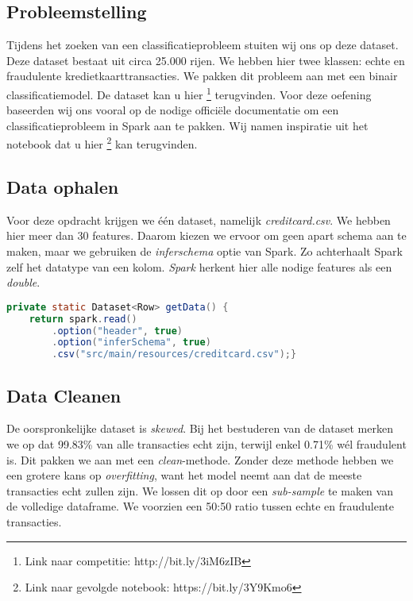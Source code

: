 \documentclass[a4paper,10pt,twoside]{report}
\begin{document}
\subsection*{Probleemstelling}

Tijdens het zoeken van een classificatieprobleem stuiten wij ons op deze dataset. Deze dataset bestaat uit circa 25.000 rijen. We hebben hier twee klassen: echte en fraudulente kredietkaarttransacties. We pakken dit probleem aan met een binair classificatiemodel. De dataset kan u hier \footnote{Link naar competitie: http://bit.ly/3iM6zIB} terugvinden. Voor deze oefening baseerden wij ons vooral op de nodige officiële documentatie om een classificatieprobleem in Spark aan te pakken. Wij namen inspiratie uit het notebook dat u hier \footnote{Link naar gevolgde notebook: https://bit.ly/3Y9Kmo6} kan terugvinden.

\subsection*{Data ophalen}

Voor deze opdracht krijgen we één dataset, namelijk \textit{creditcard.csv}. We hebben hier meer dan 30 features. Daarom kiezen we ervoor om geen apart schema aan te maken, maar we gebruiken de \textit{inferschema} optie van Spark. Zo achterhaalt Spark zelf het datatype van een kolom. \textit{Spark} herkent hier alle nodige features als een \textit{double}.

\begin{lstlisting}[language=Java]
private static Dataset<Row> getData() {
	return spark.read()
		.option("header", true)
		.option("inferSchema", true)
		.csv("src/main/resources/creditcard.csv");}
\end{lstlisting}

\subsection*{Data Cleanen}

De oorspronkelijke dataset is \textit{skewed}. Bij het bestuderen van de dataset merken we op dat 99.83\% van alle transacties echt zijn, terwijl enkel 0.71\% wél fraudulent is. Dit pakken we aan met een \textit{clean}-methode. Zonder deze methode hebben we een grotere kans op \textit{overfitting}, want het model neemt aan dat de meeste transacties echt zullen zijn. We lossen dit op door een \textit{sub-sample} te maken van de volledige dataframe. We voorzien een 50:50 ratio tussen echte en fraudulente transacties.
\end{document}
